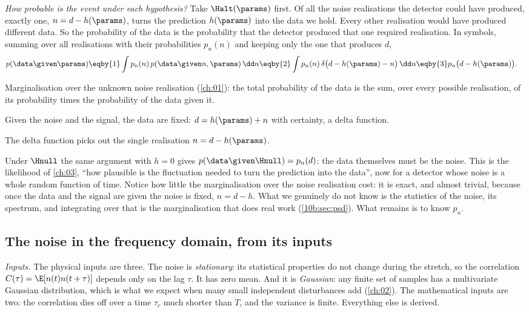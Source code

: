 \emph{How probable is the event under each hypothesis?} Take $\Halt(\params)$ first. Of all the noise
realisations the detector could have produced, exactly one, $n=d-h(\params)$, turns the prediction $h(\params)$
into the data we hold. Every other realisation would have produced different data. So the probability of the
data is the probability that the detector produced that one required realisation. In symbols, summing over all
realisations with their probabilities $p_n(n)$ and keeping only the one that produces $d$,
\begin{align}
  p(\data\given\params)
  &\eqby{1}\int p_n(n)\,p(\data\given n,\params)\,\dd n
  \eqby{2}\int p_n(n)\,\delta\big(d-h(\params)-n\big)\,\dd n
  \eqby{3}p_n\big(d-h(\params)\big).
  \label{10b:eq:like-required-noise}
\end{align}
\begin{explain}
  \item Marginalisation over the unknown noise realisation (\cref{ch:01}): the total probability of the data is
        the sum, over every possible realisation, of its probability times the probability of the data given it.
  \item Given the noise and the signal, the data are fixed: $d=h(\params)+n$ with certainty, a delta function.
  \item The delta function picks out the single realisation $n=d-h(\params)$.
\end{explain}
Under $\Hnull$ the same argument with $h=0$ gives $p(\data\given\Hnull)=p_n(d)$: the data themselves must be the
noise. This is the likelihood of \cref{ch:03}, ``how plausible is the fluctuation needed to turn the prediction
into the data'', now for a detector whose noise is a whole random function of time. Notice how little the marginalisation over the
noise realisation cost: it is exact, and almost trivial, because once the data and the signal are given the noise is
fixed, $n=d-h$. What we genuinely do not know is the statistics of the noise, its spectrum, and integrating over that
is the marginalisation that does real work (\cref{10b:sec:psd}). What remains is to know $p_n$.

\subsection{The noise in the frequency domain, from its inputs}
\label{10b:sec:noise-fd}

\emph{Inputs.} The physical inputs are three. The noise is \emph{stationary}: its statistical properties do not
change during the stretch, so the correlation $C(\tau)=\E[n(t)n(t+\tau)]$ depends only on the lag $\tau$. It has
zero mean. And it is \emph{Gaussian}: any finite set of samples has a multivariate Gaussian distribution, which is
what we expect when many small independent disturbances add (\cref{ch:02}). The mathematical inputs are two: the
correlation dies off over a time $\tau_c$ much shorter than $T$, and the variance is finite. Everything else is
derived.

